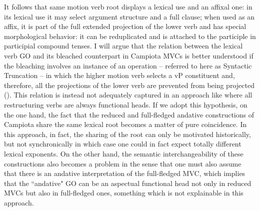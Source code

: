 \documentclass[output=paper]{langscibook}
\begin{document}
It follows that same motion verb root displays a lexical use and an affixal one:  in its lexical use it may select argument structure and a full clause; when used as an affix, it is part of the full extended projection of the lower verb and has special morphological behavior: it can be reduplicated and is attached to the participle in participial compound tenses.  I will argue that the relation between the lexical verb GO and its bleached counterpart in Campiota MVCs is better understood if the bleaching involves an instance of an operation -- referred to here as Syntactic Truncation -- in which the higher motion verb selects a vP constituent and, therefore, all the projections of the lower verb are prevented from being projected (\citealt{wurmbrand2014a, wurmbrand2015, wurmbrand2017verb}). This relation is instead not adequately captured in an approach like \citet{cinque2004,cinque2006a} where all restructuring verbs are always functional heads. If we adopt this hypothesis, on the one hand, the fact that the reduced and full-fledged andative constructions of  Campiota share the same lexical root becomes a matter of pure coincidence. In this approach, in fact, the sharing of the root can only be motivated historically, but not synchronically in which case one could in fact expect totally different lexical exponents. On the other hand, the semantic interchangeability of these constructions also becomes a problem in the sense that one must also assume that there is an andative interpretation of the full-fledged MVC, which implies that the ``andative" GO can be an aspectual functional head not only in reduced MVCs but also in full-fledged ones, something which is not explainable in this approach.
\end{document}
